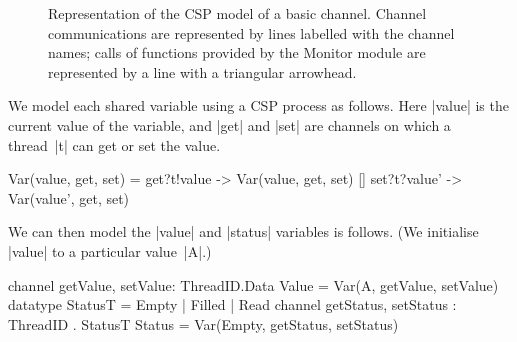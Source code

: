 
\begin{figure}
\begin{center}
\def\gap{0.1}
\def\threadW{15mm}
\def\height{8mm}
\end{center}
\caption{Representation of the CSP model of a basic channel.  Channel
  communications are represented by lines labelled with the channel names;
  calls of functions provided by the {\cspmstyle Monitor} module are
  represented by a line with a triangular arrowhead.}
\label{fig:basic-CSP-model}
\end{figure}


We model each shared variable using a CSP process as follows.  Here |value| is
the current value of the variable, and |get| and |set| are channels on which a
thread~|t| can get or set the value.
%
\begin{cspm}
Var(value, get, set) = 
  get?t!value -> Var(value, get, set)
  [] set?t?value' -> Var(value', get, set)
\end{cspm}
%
We can then model the |value| and |status| variables is follows.
(We initialise |value| to a particular value~|A|.)
\begin{cspm}
channel getValue, setValue: ThreadID.Data
Value = Var(A, getValue, setValue) 
datatype StatusT = Empty | Filled | Read
channel getStatus, setStatus : ThreadID . StatusT
Status = Var(Empty, getStatus, setStatus)
\end{cspm}

